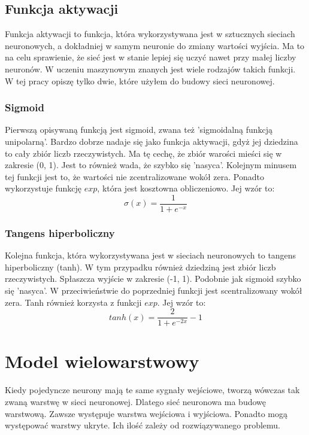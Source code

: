 \documentclass{report}
\begin{document}
    \subsection{Funkcja aktywacji}

    Funkcja aktywacji to funkcja, która wykorzystywana jest w sztucznych sieciach neuronowych, a dokładniej w samym neuronie do zmiany wartości wyjścia.
    Ma to na celu sprawienie, że sieć jest w stanie lepiej się uczyć nawet przy małej liczby neuronów.
    W uczeniu maszynowym znanych jest wiele rodzajów takich funkcji.
    W tej pracy opiszę tylko dwie, które użyłem do budowy sieci neuronowej.

    \subsubsection{Sigmoid}

    Pierwszą opisywaną funkcją jest sigmoid, zwana też 'sigmoidalną funkcją unipolarną'.
    Bardzo dobrze nadaje się jako funkcja aktywacji, gdyż jej dziedzina to cały zbiór liczb rzeczywistych.
    Ma tę cechę, że zbiór warości mieści się w zakresie (0, 1).
    Jest to również wada, że szybko się 'nasyca'.
    Kolejnym minusem tej funkcji jest to, że wartości nie zcentralizowane wokół zera.
    Ponadto wykorzystuje funkcję $exp$, która jest kosztowna obliczeniowo.
    Jej wzór to:
    $$
    \sigma(x) = \frac {1}{1+e^{-x}}
    $$


    \subsubsection{Tangens hiperboliczny}
    Kolejna funkcja, która wykorzystywana jest w sieciach neuronowych to tangens hiperboliczny (tanh).
    W tym przypadku również dziedziną jest zbiór liczb rzeczywistych.
    Spłaszcza wyjście w zakresie (-1, 1).
    Podobnie jak sigmoid szybko się 'nasyca'.
    W przeciwieństwie do poprzedniej funkcji jest scentralizowany wokół zera.
    Tanh również korzysta z funkcji $exp$.
    Jej wzór to:
    $$
    tanh(x) = \frac {2}{1+e^{-2x}} - 1
    $$



    \section{Model wielowarstwowy}

    Kiedy pojedyncze neurony mają te same sygnały wejściowe, tworzą wówczas tak zwaną warstwę w sieci neuronowej.
    Dlatego sieć neuronowa ma budowę warstwową.
    Zawsze występuje warstwa wejściowa i wyjściowa.
    Ponadto mogą występować warstwy ukryte.
    Ich ilość zależy od rozwiązywanego problemu.
\end{document}
